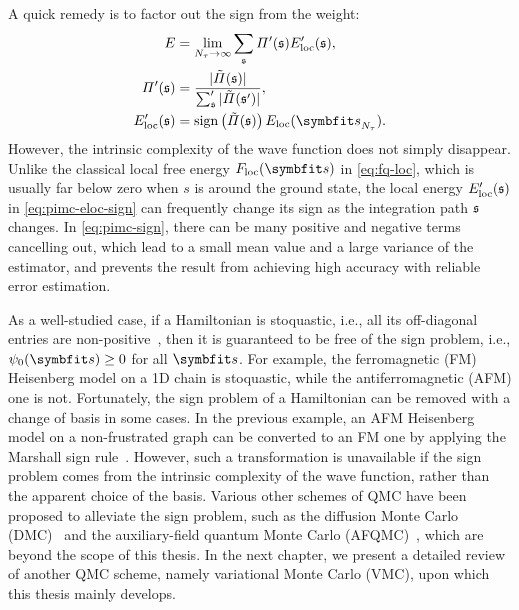 A quick remedy is to factor out the sign from the weight:
\begin{align}
E &= \lim_{N_\tau \to \infty} \sum_\svs \varPi'(\svs) E'_\text{loc}(\svs), \label{eq:pimc-sign} \\
\varPi'(\svs) &= \frac{|\tilde{\varPi}(\svs)|}{\sum_\svs' |\tilde{\varPi}(\svs')|}, \\
E'_\text{loc}(\svs) &= \sign\left( \tilde{\varPi}(\svs) \right) E_\text{loc}(\vs_{N_\tau}). \label{eq:pimc-eloc-sign}
\end{align}
However, the intrinsic complexity of the wave function does not simply disappear. Unlike the classical local free energy $F_\text{loc}(\vs)$ in \cref{eq:fq-loc}, which is usually far below zero when $s$ is around the ground state, the local energy $E'_\text{loc}(\mathfrak{s})$ in \cref{eq:pimc-eloc-sign} can frequently change its sign as the integration path $\mathfrak{s}$ changes. In \cref{eq:pimc-sign}, there can be many positive and negative terms cancelling out, which lead to a small mean value and a large variance of the estimator, and prevents the result from achieving high accuracy with reliable error estimation.

As a well-studied case, if a Hamiltonian is stoquastic, i.e., all its off-diagonal entries are non-positive~\cite{bravyi2008complexity}, then it is guaranteed to be free of the sign problem, i.e., $\psi_0(\vs) \ge 0$ for all $\vs$. For example, the ferromagnetic (FM) Heisenberg model on a 1D chain is stoquastic, while the antiferromagnetic (AFM) one is not. Fortunately, the sign problem of a Hamiltonian can be removed with a change of basis in some cases. In the previous example, an AFM Heisenberg model on a non-frustrated graph can be converted to an FM one by applying the Marshall sign rule~\cite{marshall1955antiferromagnetism}. However, such a transformation is unavailable if the sign problem comes from the intrinsic complexity of the wave function, rather than the apparent choice of the basis. Various other schemes of QMC have been proposed to alleviate the sign problem, such as the diffusion Monte Carlo (DMC)~\cite{reynolds1982fixed} and the auxiliary-field quantum Monte Carlo (AFQMC)~\cite{zhang2003quantum}, which are beyond the scope of this thesis. In the next chapter, we present a detailed review of another QMC scheme, namely variational Monte Carlo (VMC), upon which this thesis mainly develops.
